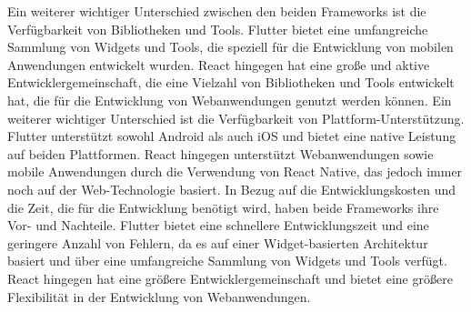 Ein weiterer wichtiger Unterschied zwischen den beiden Frameworks ist die Verfügbarkeit von Bibliotheken und Tools. Flutter bietet eine umfangreiche Sammlung von Widgets und Tools, die speziell für die Entwicklung von mobilen Anwendungen entwickelt wurden. 
React hingegen hat eine große und aktive Entwicklergemeinschaft, die eine Vielzahl von Bibliotheken und Tools entwickelt hat, die für die Entwicklung von Webanwendungen genutzt werden können.
Ein weiterer wichtiger Unterschied ist die Verfügbarkeit von Plattform-Unterstützung. 
Flutter unterstützt sowohl Android als auch iOS und bietet eine native Leistung auf beiden Plattformen. 
React hingegen unterstützt Webanwendungen sowie mobile Anwendungen durch die Verwendung von React Native, das jedoch immer noch auf der Web-Technologie basiert.
In Bezug auf die Entwicklungskosten und die Zeit, die für die Entwicklung benötigt wird, haben beide Frameworks ihre Vor- und Nachteile. 
Flutter bietet eine schnellere Entwicklungszeit und eine geringere Anzahl von Fehlern, da es auf einer Widget-basierten Architektur basiert und über eine umfangreiche Sammlung von Widgets und Tools verfügt. 
React hingegen hat eine größere Entwicklergemeinschaft und bietet eine größere Flexibilität in der Entwicklung von Webanwendungen.
\cite{React}
\newpage

